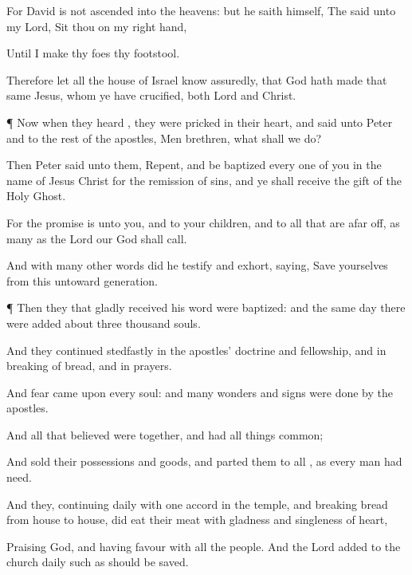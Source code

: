 {For
David
is
not
ascended
into the
heavens:
but he
saith
himself, The
{}
said
unto
my
Lord, Sit
thou
on
my right
hand,

Until I
make
thy
foes
thy
footstool.

Therefore
let
all the
house of
Israel
know
assuredly,
that
God hath
made
that
same
Jesus,
whom
ye have
crucified,
both
Lord
and
Christ.


\par }{\PP {}¶ Now
when they
heard
{}, they were
pricked in their
heart,
and
said
unto
Peter
and to the
rest of the
apostles,
Men
{}
brethren,
what shall we
do?

Then
Peter
said
unto
them,
Repent,
and be
baptized every
one of
you
in the
name of
Jesus
Christ
for the
remission of
sins,
and ye shall
receive the
gift of
the
Holy
Ghost.

For the
promise
is unto
you,
and
to
your
children,
and to
all
that
are afar
off,
{} as many
as the
Lord
our
God shall
call.

And
with
many
other
words did he
testify
and
exhort,
saying, Save
yourselves
from
this
untoward
generation.


\par }{\PP {}¶
Then
they
that
gladly
received
his
word were
baptized:
and the
same
day there were
added
{}
about three
thousand
souls.

And they continued
stedfastly
in the
apostles’
doctrine
and
fellowship,
and in
breaking of
bread,
and in
prayers.

And
fear came
upon
every
soul:
and
many
wonders
and
signs were
done
by the
apostles.

And
all that
believed
were
together,
and
had all
things
common;

And sold
their
possessions
and
goods,
and
parted
them to
all
{},
as
every
man
had
need.

And they,
continuing
daily with one
accord
in the
temple,
and
breaking
bread from
house to
house, did eat
their
meat
with
gladness
and
singleness of
heart,

Praising
God,
and
having
favour
with
all the
people.
And the
Lord
added to the
church
daily
such
as should be
saved.




\par }
